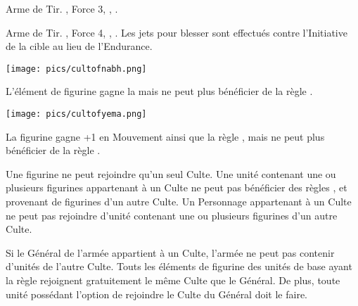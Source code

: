 {{{{{{{{\begin{multicols}{2}
\end{multicols}

\closearmyspecialrules




\vspace*{1.5cm}
\startarmyarmoury

\startitemlistonecol

\listitemonecol{\repeatercrossbow} Arme de Tir. , Force 3, , .

\listitemonecol{\petrifyingstare} Arme de Tir. , Force 4, , . Les jets pour blesser sont effectués contre l'Initiative de la cible au lieu de l'Endurance.

\enditemlistonecol

\closearmyarmoury





\newcommand{\logosize}{4cm}
\begin{multicols}{2}\raggedcolumns
\begin{center}
\texttt{[image: pics/cultofnabh.png]}
\armyspecialruleentry{\cultofnabh}

L'élément de figurine gagne la \hatred{} mais ne peut plus bénéficier de la règle \killerinstinct{}.
\end{center}

\begin{center}
\texttt{[image: pics/cultofyema.png]}
\armyspecialruleentry{\cultofyema}

La figurine gagne +1 en Mouvement ainsi que la règle \strider{}, mais ne peut plus bénéficier de la règle \killerinstinct{}.
\end{center}
\end{multicols}

\armyspecialruleentry{\cultrivalry}

Une figurine ne peut rejoindre qu'un seul Culte. Une unité contenant une ou plusieurs figurines appartenant à un Culte ne peut pas bénéficier des règles \holdyourground{}, \inspiringpresence{} et \divineblessings{} provenant de figurines d'un autre Culte. Un Personnage appartenant à un Culte ne peut pas rejoindre d'unité contenant une ou plusieurs figurines d'un autre Culte.

\armyspecialruleentry{\cultistgeneral}

Si le Général de l'armée appartient à un Culte, l'armée ne peut pas contenir d'unités de l'autre Culte. Touts les éléments de figurine des unités de base ayant la règle \killerinstinct{} rejoignent gratuitement le même Culte que le Général. De plus, toute unité possédant l'option de rejoindre le Culte du Général doit le faire.

}}}}}}}}
